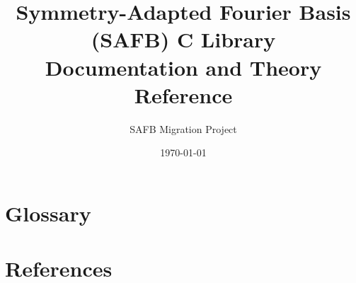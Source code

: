 \documentclass[12pt,letterpaper]{report}
\title{\textbf{Symmetry-Adapted Fourier Basis (SAFB) C Library}\\[1em]
Documentation and Theory Reference}
\author{SAFB Migration Project}
\date{\today}
\begin{document}
\maketitle

\tableofcontents









\chapter{Glossary}



\chapter{References}



\end{document}
